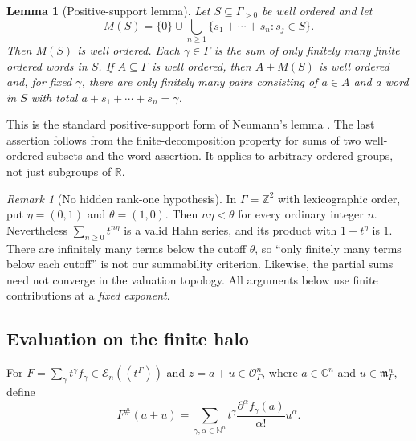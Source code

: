 \documentclass[11pt,letterpaper]{article}
\numberwithin{equation}{section}
\newtheorem{lemma}[theorem]{Lemma}
\theoremstyle{definition}
\theoremstyle{remark}
\newtheorem{remark}[theorem]{Remark}
\newcommand{\C}{\mathbb C}
\newcommand{\R}{\mathbb R}
\newcommand{\N}{\mathbb N}
\newcommand{\Z}{\mathbb Z}
\newcommand{\E}{\mathscr E}
\newcommand{\OO}{\mathcal O}
\newcommand{\mm}{\mathfrak m}
\newcommand{\HH}[1]{#1((t^\Gamma))}
\begin{document}
\begin{lemma}[Positive-support lemma]\label{lem:neumann}
Let $S\subseteq\Gamma_{>0}$ be well ordered and let
\[
 M(S)=\{0\}\cup\bigcup_{n\ge1}\{s_1+\cdots+s_n:s_j\in S\}.
\]
Then $M(S)$ is well ordered. Each $\gamma\in\Gamma$ is the sum of only
finitely many finite ordered words in $S$. If $A\subseteq\Gamma$ is well
ordered, then $A+M(S)$ is well ordered and, for fixed $\gamma$, there are only
finitely many pairs consisting of $a\in A$ and a word in $S$ with total
$a+s_1+\cdots+s_n=\gamma$.
\end{lemma}
This is the standard positive-support form of Neumann's lemma
\cite{neumann}. The last assertion follows from the finite-decomposition
property for sums of two well-ordered subsets and the word assertion. It
applies to arbitrary ordered groups, not just subgroups of $\R$.

\begin{remark}[No hidden rank-one hypothesis]\label{rem:rank}
In $\Gamma=\Z^2$ with lexicographic order, put $\eta=(0,1)$ and
$\theta=(1,0)$. Then $n\eta<\theta$ for every ordinary integer $n$.
Nevertheless $\sum_{n\ge0}t^{n\eta}$ is a valid Hahn series, and its product
with $1-t^\eta$ is $1$. There are infinitely many terms below the cutoff
$\theta$, so ``only finitely many terms below each cutoff'' is not our
summability criterion. Likewise, the partial sums need not converge in the
valuation topology. All arguments below use finite contributions at a
\emph{fixed exponent}.
\end{remark}

\subsection{Evaluation on the finite halo}
For $F=\sum_\gamma t^\gamma f_\gamma\in\HH{\E_n}$ and
$z=a+u\in\OO_\Gamma^n$, where $a\in\C^n$ and $u\in\mm_\Gamma^n$, define
\begin{equation}\label{eq:eval}
 F^\#(a+u)=
 \sum_{\gamma,\alpha\in\N^n}
 t^\gamma\frac{\partial^\alpha f_\gamma(a)}{\alpha!}u^\alpha.
\end{equation}
\end{document}

